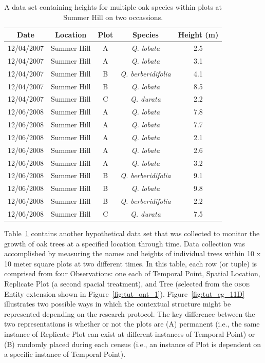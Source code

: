 \documentclass[article,oneside]{memoir}
\newcommand{\obs}{\textsc{oboe}}
\begin{document}
\begin{table}[htbp]
  \centering
 \caption{A data set containing heights for multiple oak species within plots at Summer Hill on two occassions.}
 \begin{tabular}{ @{} ccccc @{} }
   \toprule
   Date & Location & Plot & Species & Height (m) \\
   \midrule
   12/04/2007 & Summer Hill & A & \textit{Q. lobata} & 2.5 \\
   12/04/2007 & Summer Hill & A & \textit{Q. lobata} & 3.1 \\
   12/04/2007 & Summer Hill & B & \textit{Q. berberidifolia} & 4.1 \\
   12/04/2007 & Summer Hill & B & \textit{Q. lobata} & 8.5 \\
   12/04/2007 & Summer Hill & C & \textit{Q. durata} & 2.2 \\
   12/06/2008 & Summer Hill & A & \textit{Q. lobata} & 7.8 \\
   12/06/2008 & Summer Hill & A & \textit{Q. lobata} & 7.7 \\
   12/06/2008 & Summer Hill & A & \textit{Q. lobata} & 2.1 \\
   12/06/2008 & Summer Hill & A & \textit{Q. lobata} & 2.6 \\
   12/06/2008 & Summer Hill & A & \textit{Q. lobata} & 3.2 \\
   12/06/2008 & Summer Hill & B & \textit{Q. berberidifolia} & 9.1 \\
   12/06/2008 & Summer Hill & B & \textit{Q. lobata} & 9.8 \\
   12/06/2008 & Summer Hill & B & \textit{Q. berberidifolia} & 2.2 \\
   12/06/2008 & Summer Hill & C & \textit{Q. durata} & 7.5 \\
   \bottomrule
 \end{tabular}
\label{tab:context}
\end{table}

Table~\ref{tab:context} contains another hypothetical data set that
was collected to monitor the growth of oak trees at a specified
location through time.  Data collection was accomplished by measuring
the names and heights of individual trees within 10 x 10 meter square
plots at two different times.  In this table, each row (or tuple) is
comprised from four Observations: one each of Temporal Point, Spatial
Location, Replicate Plot (a second spacial treatment), and Tree
(selected from the \obs{} Entity extension shown in
Figure~\ref{fig:tut_ont_1}).  Figure~\ref{fig:tut_eg_11D} illustrates
two possible ways in which the contextual structure might be
represented depending on the research protocol.  The key difference
between the two representations is whether or not the plots are (A)
permanent (i.e., the same instance of Replicate Plot can exist at
different instances of Temporal Point) or (B) randomly placed during
each census (i.e., an instance of Plot is dependent on a specific
instance of Temporal Point).
\end{document}
